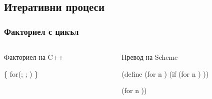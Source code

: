 \documentclass{beamer}
\begin{document}
\lstset{basicstyle=\ttfamily}

\subsection{Итеративни процеси}

\begin{frame}[fragile]
  \frametitle{Факториел с цикъл}

  \begin{columns}[t,onlytextwidth]
    \begin{column}{.5\textwidth}
      Факториел на C++\\
\begin{semiverbatim}
 \{
  for(; ; )
\}
\end{semiverbatim}
    \end{column}
    \pause
    \begin{column}{.5\textwidth}
      Превод на Scheme\\
\begin{semiverbatim}
(define (for n  )
  (if 
      (for n  )
      ))

  (for n  ))
\end{semiverbatim}
    \end{column}
  \end{columns}
\end{frame}
\end{document}
